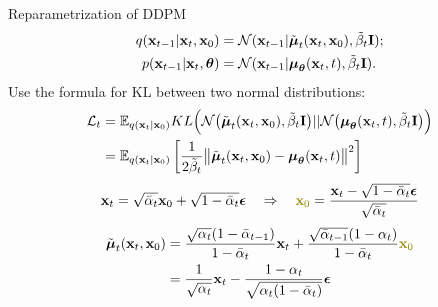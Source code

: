 \begin{frame}{Reparametrization of DDPM}
	\vspace{-0.5cm}
	\begin{align*}
		q(\mathbf{x}_{t-1} | \mathbf{x}_t, \mathbf{x}_0) &= \mathcal{N}(\mathbf{x}_{t-1} | \tilde{\boldsymbol{\mu}}_t(\mathbf{x}_t, \mathbf{x}_0), \tilde{\beta}_t \mathbf{I}); \\
		p(\mathbf{x}_{t - 1} | \mathbf{x}_t, \boldsymbol{\theta}) &= \mathcal{N} (\mathbf{x}_{t - 1} | \boldsymbol{\mu}_{\boldsymbol{\theta}}(\mathbf{x}_t, t), \tilde{\beta}_t \mathbf{I} ).
	\end{align*}
	Use the formula for KL between two normal distributions:
	\begin{align*}
		\mathcal{L}_t &= \mathbb{E}_{q(\mathbf{x}_t | \mathbf{x}_0)} KL\Bigl(\mathcal{N}\bigl(\tilde{\boldsymbol{\mu}}_t(\mathbf{x}_t, \mathbf{x}_0), \tilde{\beta}_t \mathbf{I} \bigr) || \mathcal{N}\bigl(\boldsymbol{\mu}_{\boldsymbol{\theta}}(\mathbf{x}_t, t), \tilde{\beta}_t \mathbf{I}\bigr)\Bigr) \\ 
		&= \mathbb{E}_{q(\mathbf{x}_t | \mathbf{x}_0)} \left[\frac{1}{2\tilde{\beta}_t} \bigl\| \tilde{\boldsymbol{\mu}}_t(\mathbf{x}_t, \mathbf{x}_0) - \boldsymbol{\mu}_{\boldsymbol{\theta}}(\mathbf{x}_t, t) \bigr\|^2  \right]
	\end{align*}
	\vspace{-0.2cm}
	\[
		\bx_t = \sqrt{\bar{\alpha}_t} \bx_0 + \sqrt{1 - \bar{\alpha}_t} \bepsilon \quad \Rightarrow \quad {\color{olive} \bx_0} = \frac{\bx_t -  \sqrt{1 - \bar{\alpha}_t} \bepsilon}{\sqrt{\bar{\alpha}_t}}
	\]
	\vspace{-0.2cm}
	\begin{align*}
		\tilde{\bmu}_t(\bx_t, \bx_0) &= \frac{\sqrt{\alpha_t}(1 - \bar{\alpha}_{t-1})}{1 - \bar{\alpha}_t} \bx_t + \frac{\sqrt{\bar{\alpha}_{t-1}}(1 - \alpha_t)}{1 - \bar{\alpha}_t} {\color{olive} \bx_0} \\
		&= \frac{1}{\sqrt{\alpha_t}} \bx_t - \frac{1 - \alpha_t}{\sqrt{\alpha_t (1 - \bar{\alpha}_t)}} \bepsilon
	\end{align*}
	\end{frame}
